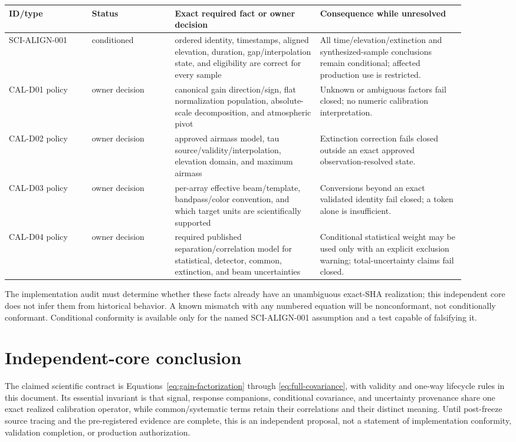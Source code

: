 \documentclass[11pt]{article}
\begin{document}
\begin{longtable}{L{0.16\linewidth}L{0.16\linewidth}L{0.29\linewidth}L{0.29\linewidth}}
\toprule
ID/type & Status & Exact required fact or owner decision & Consequence while unresolved\\
\midrule
SCI-ALIGN-001 & conditioned & ordered identity, timestamps, aligned elevation, duration, gap/interpolation state, and eligibility are correct for every sample & All time/elevation/extinction and synthesized-sample conclusions remain conditional; affected production use is restricted.\\
CAL-D01 policy & owner decision & canonical gain direction/sign, flat normalization population, absolute-scale decomposition, and atmospheric pivot & Unknown or ambiguous factors fail closed; no numeric calibration interpretation.\\
CAL-D02 policy & owner decision & approved airmass model, tau source/validity/interpolation, elevation domain, and maximum airmass & Extinction correction fails closed outside an exact approved observation-resolved state.\\
CAL-D03 policy & owner decision & per-array effective beam/template, bandpass/color convention, and which target units are scientifically supported & Conversions beyond an exact validated identity fail closed; a token alone is insufficient.\\
CAL-D04 policy & owner decision & required published separation/correlation model for statistical, detector, common, extinction, and beam uncertainties & Conditional statistical weight may be used only with an explicit exclusion warning; total-uncertainty claims fail closed.\\
\bottomrule
\end{longtable}

The implementation audit must determine whether these facts already have an
unambiguous exact-SHA realization; this independent core does not infer them
from historical behavior.  A known mismatch with any numbered equation will
be nonconformant, not conditionally conformant.  Conditional conformity is
available only for the named SCI-ALIGN-001 assumption and a test capable of
falsifying it.

\section{Independent-core conclusion}

The claimed scientific contract is Equations~\eqref{eq:gain-factorization}
through \eqref{eq:full-covariance}, with validity and one-way lifecycle rules
in this document.  Its essential invariant is that signal, response
companions, conditional covariance, and uncertainty provenance share one exact
realized calibration operator, while common/systematic terms retain their
correlations and their distinct meaning.  Until post-freeze source tracing and
the pre-registered evidence are complete, this is an independent proposal,
not a statement of implementation conformity, validation completion, or
production authorization.
\end{document}
